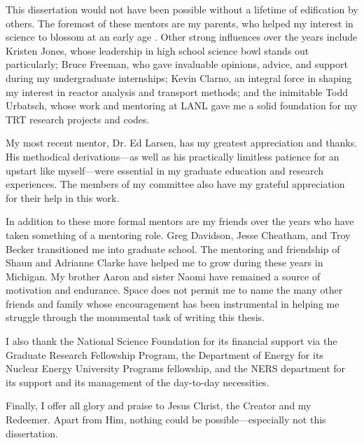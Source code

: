 \documentclass[twoside]{umthesis}
\begin{document}
\begin{acknowledgments}
  This dissertation would not have been possible without a lifetime of
  edification by others. The foremost of these mentors are my
  parents, who helped my
  interest in science to blossom at an early age \cite{Lew1989}.
  Other strong influences over the years include Kristen Jones, whose
  leadership in high school science bowl stands out particularly;
  Bruce Freeman, who gave invaluable opinions, advice, and support during my
  undergraduate internships; Kevin Clarno, an
  integral force in shaping my interest in reactor analysis and transport
  methods; and the inimitable Todd Urbatsch, whose work and mentoring at LANL
  gave me a solid foundation for my TRT research projects and codes.

  My most recent mentor, Dr. Ed Larsen, has my greatest appreciation and thanks.
  His methodical derivations---as well as his practically limitless patience for
  an upstart like myself---were essential in my graduate education and
  research experiences. The members of my committee also have my grateful
  appreciation for their help in this work.

  In addition to these more formal mentors are my friends over the years who
  have taken something of a mentoring role. Greg Davidson, Jesse Cheatham, and
  Troy Becker transitioned me into graduate school.
  The mentoring and friendship of Shaun and Adrianne Clarke have
  helped me to grow during these years in Michigan. My brother Aaron and sister
  Naomi have remained a source of motivation and endurance.
  Space does not permit me to name the many other friends and family whose
  encouragement
  has been instrumental in helping me struggle through the monumental task of
  writing this thesis.

  I also thank the National Science Foundation for its financial support via
  the Graduate Research Fellowship Program, the Department of Energy for its
  Nuclear Energy University Programs fellowship, and the NERS department for its
  support and its management of the day-to-day necessities.

  Finally, I offer all glory and praise to Jesus Christ, the Creator and my
  Redeemer. Apart from Him, nothing could be possible---especially not this
  dissertation.
\end{acknowledgments}


\end{document}

